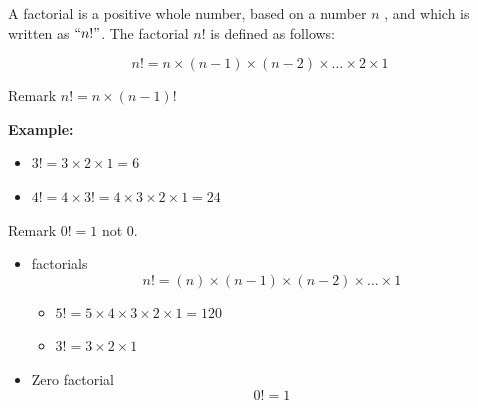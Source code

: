\documentclass[12pt]{report}
\begin{document}
	{\Large
		
		A factorial is a positive whole number, based on a number $n$ , and which is written as $``n!"$. The factorial $n!$ is defined as follows:
		
		\[n!  =n \times (n-1) \times (n-2) \times \ldots \times 2 \times 1 \]
		
		Remark $n!  =n \times (n-1)!$\\ \bigskip
		
		\textbf{ Example: }
		
		\begin{itemize}
			\item $3!  = 3 \times 2  \times 1 = 6 $
			
			\item $4!  = 4 \times 3! = 4 \times 3 \times 2 \times 1 = 24$
		\end{itemize}
		Remark $0! = 1$ not $0$.
		
		
	}
\begin{itemize}
	\item factorials 
	\[ n! = (n)\times (n-1)\times(n-2) \times \ldots \times 1 \]
	\begin{itemize}
		\item $5! = 5 \times 4 \times 3 \times 2 \times 1 = 120 $
		\item $3! = 3 \times 2 \times 1$
	\end{itemize}
	\item Zero factorial
	\[ 0! =  1 \]
\end{itemize}	


\newpage
\end{document}
